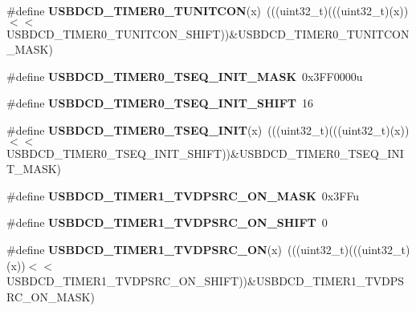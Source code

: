 \begin{DoxyCompactItemize}
\item 
\#define {\bfseries U\+S\+B\+D\+C\+D\+\_\+\+T\+I\+M\+E\+R0\+\_\+\+T\+U\+N\+I\+T\+C\+ON}(x)~(((uint32\+\_\+t)(((uint32\+\_\+t)(x))$<$$<$U\+S\+B\+D\+C\+D\+\_\+\+T\+I\+M\+E\+R0\+\_\+\+T\+U\+N\+I\+T\+C\+O\+N\+\_\+\+S\+H\+I\+FT))\&U\+S\+B\+D\+C\+D\+\_\+\+T\+I\+M\+E\+R0\+\_\+\+T\+U\+N\+I\+T\+C\+O\+N\+\_\+\+M\+A\+SK)\hypertarget{group__USBDCD__Register__Masks_gad525be70f6473a29d051b39335f48b0c}{}\label{group__USBDCD__Register__Masks_gad525be70f6473a29d051b39335f48b0c}

\item 
\#define {\bfseries U\+S\+B\+D\+C\+D\+\_\+\+T\+I\+M\+E\+R0\+\_\+\+T\+S\+E\+Q\+\_\+\+I\+N\+I\+T\+\_\+\+M\+A\+SK}~0x3\+F\+F0000u\hypertarget{group__USBDCD__Register__Masks_ga2310e6984a2a488e960ca824ddce9ffc}{}\label{group__USBDCD__Register__Masks_ga2310e6984a2a488e960ca824ddce9ffc}

\item 
\#define {\bfseries U\+S\+B\+D\+C\+D\+\_\+\+T\+I\+M\+E\+R0\+\_\+\+T\+S\+E\+Q\+\_\+\+I\+N\+I\+T\+\_\+\+S\+H\+I\+FT}~16\hypertarget{group__USBDCD__Register__Masks_gaa7db9a795f782afd4b38408bc23b4b49}{}\label{group__USBDCD__Register__Masks_gaa7db9a795f782afd4b38408bc23b4b49}

\item 
\#define {\bfseries U\+S\+B\+D\+C\+D\+\_\+\+T\+I\+M\+E\+R0\+\_\+\+T\+S\+E\+Q\+\_\+\+I\+N\+IT}(x)~(((uint32\+\_\+t)(((uint32\+\_\+t)(x))$<$$<$U\+S\+B\+D\+C\+D\+\_\+\+T\+I\+M\+E\+R0\+\_\+\+T\+S\+E\+Q\+\_\+\+I\+N\+I\+T\+\_\+\+S\+H\+I\+FT))\&U\+S\+B\+D\+C\+D\+\_\+\+T\+I\+M\+E\+R0\+\_\+\+T\+S\+E\+Q\+\_\+\+I\+N\+I\+T\+\_\+\+M\+A\+SK)\hypertarget{group__USBDCD__Register__Masks_ga87e981b43bb55f4fdf60d88f85bc31ad}{}\label{group__USBDCD__Register__Masks_ga87e981b43bb55f4fdf60d88f85bc31ad}

\item 
\#define {\bfseries U\+S\+B\+D\+C\+D\+\_\+\+T\+I\+M\+E\+R1\+\_\+\+T\+V\+D\+P\+S\+R\+C\+\_\+\+O\+N\+\_\+\+M\+A\+SK}~0x3\+F\+Fu\hypertarget{group__USBDCD__Register__Masks_ga92a3ff207a03a829c52722ee439a6e2a}{}\label{group__USBDCD__Register__Masks_ga92a3ff207a03a829c52722ee439a6e2a}

\item 
\#define {\bfseries U\+S\+B\+D\+C\+D\+\_\+\+T\+I\+M\+E\+R1\+\_\+\+T\+V\+D\+P\+S\+R\+C\+\_\+\+O\+N\+\_\+\+S\+H\+I\+FT}~0\hypertarget{group__USBDCD__Register__Masks_gaf618094ca6122f71185c4152a74ab1e3}{}\label{group__USBDCD__Register__Masks_gaf618094ca6122f71185c4152a74ab1e3}

\item 
\#define {\bfseries U\+S\+B\+D\+C\+D\+\_\+\+T\+I\+M\+E\+R1\+\_\+\+T\+V\+D\+P\+S\+R\+C\+\_\+\+ON}(x)~(((uint32\+\_\+t)(((uint32\+\_\+t)(x))$<$$<$U\+S\+B\+D\+C\+D\+\_\+\+T\+I\+M\+E\+R1\+\_\+\+T\+V\+D\+P\+S\+R\+C\+\_\+\+O\+N\+\_\+\+S\+H\+I\+FT))\&U\+S\+B\+D\+C\+D\+\_\+\+T\+I\+M\+E\+R1\+\_\+\+T\+V\+D\+P\+S\+R\+C\+\_\+\+O\+N\+\_\+\+M\+A\+SK)\hypertarget{group__USBDCD__Register__Masks_ga1a9a39c864450fac6194594af36b0aaf}{}\label{group__USBDCD__Register__Masks_ga1a9a39c864450fac6194594af36b0aaf}


\end{DoxyCompactItemize}
